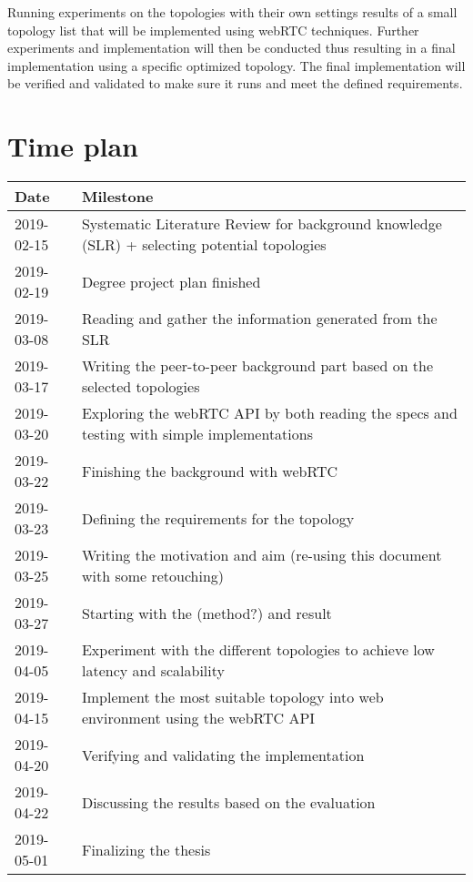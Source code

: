 \documentclass[12pt]{article}
\begin{document}
\noindent Running experiments on the topologies with their own settings results of 
a small topology list that will be implemented using webRTC techniques. 
Further experiments and implementation will then be conducted thus resulting
in a final implementation using a specific optimized topology. The final 
implementation will be verified and validated to make sure it runs and 
meet the defined requirements. 


\section*{Time plan}
\begin{tabular} {|p{2.6cm}|p{10.2cm}|} \hline
\textbf{Date} & \textbf{Milestone} \\ \hline
2019-02-15 & Systematic Literature Review for background knowledge (SLR) + selecting potential topologies \\ \hline
2019-02-19 & Degree project plan finished \\ \hline
2019-03-08 & Reading and gather the information generated from the SLR \\ \hline
2019-03-17 & Writing the peer-to-peer background part based on the selected topologies \\ \hline
2019-03-20 & Exploring the webRTC API by both reading the specs and testing with simple implementations  \\ \hline
2019-03-22 & Finishing the background with webRTC \\ \hline
2019-03-23 & Defining the requirements for the topology \\ \hline
2019-03-25 & Writing the motivation and aim (re-using this document with some retouching) \\ \hline
2019-03-27 & Starting with the (method?) and result \\ \hline
2019-04-05 & Experiment with the different topologies to achieve low latency and scalability \\ \hline
2019-04-15 & Implement the most suitable topology into web environment using the webRTC API \\ \hline
2019-04-20 & Verifying and validating the implementation  \\ \hline
2019-04-22 & Discussing the results based on the evaluation  \\ \hline
2019-05-01 & Finalizing the thesis  \\ \hline
\end{tabular}

\pagebreak


\end{document}
